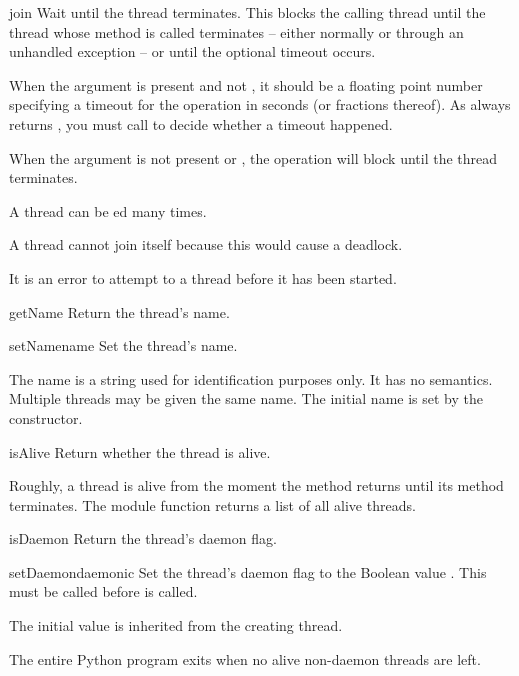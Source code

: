 \begin{methoddesc}{join}{}
Wait until the thread terminates.
This blocks the calling thread until the thread whose 
method is called terminates -- either normally or through an
unhandled exception -- or until the optional timeout occurs.

When the  argument is present and not , it
should be a floating point number specifying a timeout for the
operation in seconds (or fractions thereof). As  always 
returns , you must call  to decide whether 
a timeout happened.

When the  argument is not present or , the
operation will block until the thread terminates.

A thread can be ed many times.

A thread cannot join itself because this would cause a
deadlock.

It is an error to attempt to  a thread before it has
been started.
\end{methoddesc}

\begin{methoddesc}{getName}{}
Return the thread's name.
\end{methoddesc}

\begin{methoddesc}{setName}{name}
Set the thread's name.

The name is a string used for identification purposes only.
It has no semantics.  Multiple threads may be given the same
name.  The initial name is set by the constructor.
\end{methoddesc}

\begin{methoddesc}{isAlive}{}
Return whether the thread is alive.

Roughly, a thread is alive from the moment the  method
returns until its  method terminates. The module
function  returns a list of all alive threads.
\end{methoddesc}

\begin{methoddesc}{isDaemon}{}
Return the thread's daemon flag.
\end{methoddesc}

\begin{methoddesc}{setDaemon}{daemonic}
Set the thread's daemon flag to the Boolean value .
This must be called before  is called.

The initial value is inherited from the creating thread.

The entire Python program exits when no alive non-daemon threads are
left.
\end{methoddesc}


